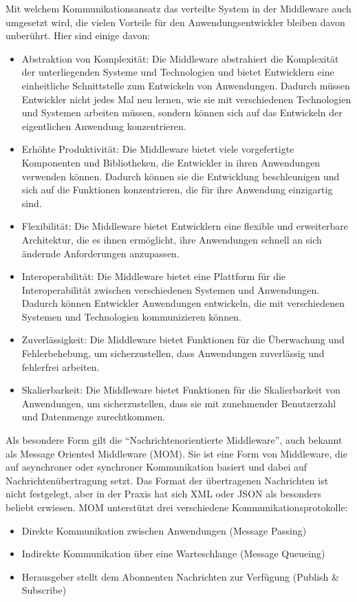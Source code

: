 \documentclass[../vs-script-first-v01.tex]{subfiles}
\begin{document}
Mit welchem Kommunikationsansatz das verteilte System in der Middleware auch umgesetzt wird, die vielen Vorteile für den Anwendungsentwickler bleiben davon unberührt. Hier sind einige davon:
\begin{itemize}
\item Abstraktion von Komplexität: Die Middleware abstrahiert die Komplexität der unterliegenden Systeme und Technologien und bietet Entwicklern eine einheitliche Schnittstelle zum Entwickeln von Anwendungen. Dadurch müssen Entwickler nicht jedes Mal neu lernen, wie sie mit verschiedenen Technologien und Systemen arbeiten müssen, sondern können sich auf das Entwickeln der eigentlichen Anwendung konzentrieren.

\item Erhöhte Produktivität: Die Middleware bietet viele vorgefertigte Komponenten und Bibliotheken, die Entwickler in ihren Anwendungen verwenden können. Dadurch können sie die Entwicklung beschleunigen und sich auf die Funktionen konzentrieren, die für ihre Anwendung einzigartig sind.

\item Flexibilität: Die Middleware bietet Entwicklern eine flexible und erweiterbare Architektur, die es ihnen ermöglicht, ihre Anwendungen schnell an sich ändernde Anforderungen anzupassen.

\item Interoperabilität: Die Middleware bietet eine Plattform für die Interoperabilität zwischen verschiedenen Systemen und Anwendungen. Dadurch können Entwickler Anwendungen entwickeln, die mit verschiedenen Systemen und Technologien kommunizieren können.

\item Zuverlässigkeit: Die Middleware bietet Funktionen für die Überwachung und Fehlerbehebung, um sicherzustellen, dass Anwendungen zuverlässig und fehlerfrei arbeiten.

\item Skalierbarkeit: Die Middleware bietet Funktionen für die Skalierbarkeit von Anwendungen, um sicherzustellen, dass sie mit zunehmender Benutzerzahl und Datenmenge zurechtkommen.
\end{itemize}
Als besondere Form gilt die \enquote{Nachrichtenorientierte Middleware}, auch bekannt als Message Oriented Middleware (MOM). Sie ist eine Form von Middleware, die auf asynchroner oder synchroner Kommunikation basiert und dabei auf Nachrichtenübertragung setzt. Das Format der übertragenen Nachrichten ist nicht festgelegt, aber in der Praxis hat sich XML oder JSON als besonders beliebt erwiesen. MOM unterstützt drei verschiedene Kommunikationsprotokolle:
\begin{itemize}
\item Direkte Kommunikation zwischen Anwendungen (Message Passing)
\item Indirekte Kommunikation über eine Warteschlange (Message Queueing)
\item Herausgeber stellt dem Abonnenten Nachrichten zur Verfügung (Publish \& Subscribe)
\end{itemize}
\end{document}
